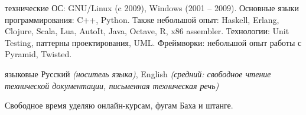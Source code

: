 \documentclass[unicode, 10pt, a4paper, oneside, fleqn]{article}
\begin{document}

\inlineheadsection  %
  {технические}
  {ОС: GNU/Linux (c 2009), Windows (2001 -- 2009).
   Основные языки программирования: C++, Python.
   Также небольшой опыт: Haskell, Erlang, Clojure, Scala, Lua, AutoIt,
   Java, Octave, R, x86 assembler.
   Технологии: Unit Testing, паттерны проектирования, UML.
   Фреймворки: небольшой опыт работы с Pyramid, Twisted.
  }

\inlineheadsection
  {языковые}
  {Русский \emph{(носитель языка)}, English \emph{(средний: свободное чтение
   технической документации, письменная техническая речь)}}

\spacedhrule{1.6em}{-0.4em}


\inlineheadsection
  {}
  {Свободное время уделяю онлайн-курсам, фугам Баха и штанге.}
\end{document}
